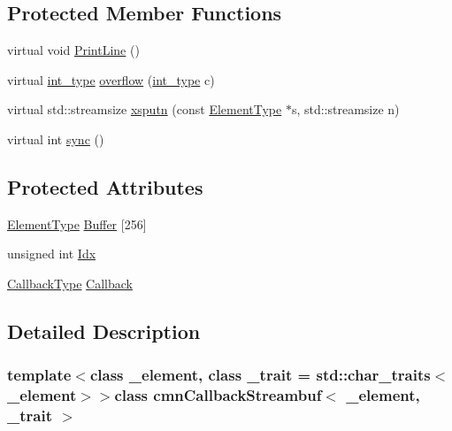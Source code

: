 \subsection*{Protected Member Functions}
\begin{DoxyCompactItemize}
\item 
virtual void \hyperlink{classcmn_callback_streambuf_a6b9c4f2c72d4ad3909959d67c25bfe78}{Print\-Line} ()
\item 
virtual \hyperlink{classcmn_callback_streambuf_a9599d576e1867902844cb4b5bf3150e8}{int\-\_\-type} \hyperlink{classcmn_callback_streambuf_ab06c380ed8bfd927dc4a83b3f3a18a39}{overflow} (\hyperlink{classcmn_callback_streambuf_a9599d576e1867902844cb4b5bf3150e8}{int\-\_\-type} c)
\item 
virtual std\-::streamsize \hyperlink{classcmn_callback_streambuf_ac5b9db0adad90622d6681c085d296b6c}{xsputn} (const \hyperlink{classcmn_callback_streambuf_a3f220172226bbffc7cebefa8d458823a}{Element\-Type} $\ast$s, std\-::streamsize n)
\item 
virtual int \hyperlink{classcmn_callback_streambuf_a8a8beb77b32c7f2856092e656632ac7c}{sync} ()
\end{DoxyCompactItemize}
\subsection*{Protected Attributes}
\begin{DoxyCompactItemize}
\item 
\hyperlink{classcmn_callback_streambuf_a3f220172226bbffc7cebefa8d458823a}{Element\-Type} \hyperlink{classcmn_callback_streambuf_ace8ce96c1695f3122b14be13b2129383}{Buffer} \mbox{[}256\mbox{]}
\item 
unsigned int \hyperlink{classcmn_callback_streambuf_a27d747a886699be88098955251af1159}{Idx}
\item 
\hyperlink{classcmn_callback_streambuf_aa8a57c63e583b464a5ef66b3d1dd8117}{Callback\-Type} \hyperlink{classcmn_callback_streambuf_a8d35b607ee946b5574313a3f3f19be27}{Callback}
\end{DoxyCompactItemize}


\subsection{Detailed Description}
\subsubsection*{template$<$class \-\_\-element, class \-\_\-trait = std\-::char\-\_\-traits$<$\-\_\-element$>$$>$class cmn\-Callback\-Streambuf$<$ \-\_\-element, \-\_\-trait $>$}

